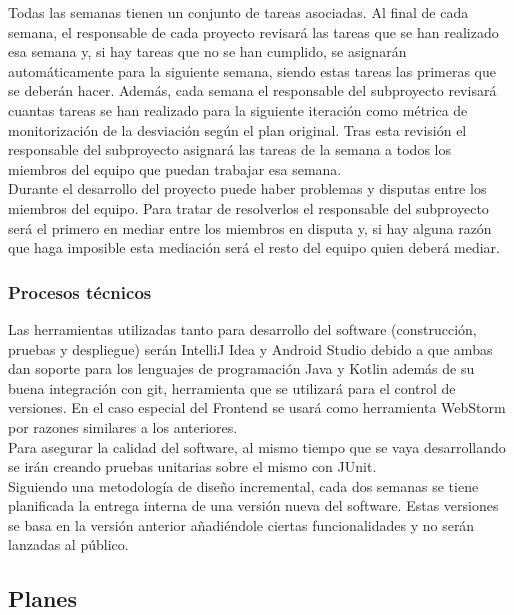 \documentclass[12pt]{article}%
\begin{document}
Todas las semanas tienen un conjunto de tareas asociadas. Al final de cada semana, el responsable de cada proyecto revisar\'a las tareas que se han realizado esa semana y, si hay tareas que no se han cumplido, se asignar\'an autom\'aticamente para la siguiente semana, siendo estas tareas las primeras que se deber\'an hacer. Adem\'as, cada semana el responsable del subproyecto revisar\'a cuantas tareas se han realizado para la siguiente iteraci\'on  como m\'etrica de monitorizaci\'on de la desviaci\'on seg\'un el plan original. Tras esta revisi\'on el responsable del subproyecto asignar\'a las tareas de la semana a todos los miembros del equipo que puedan trabajar esa semana. \\

Durante el desarrollo del proyecto puede haber problemas y disputas entre los miembros del equipo. Para tratar de resolverlos el responsable del subproyecto ser\'a el primero en mediar entre los miembros en disputa y, si hay alguna raz\'on que haga imposible esta mediaci\'on ser\'a el resto del equipo quien deber\'a mediar. \\

\subsubsection{Procesos t\'ecnicos}
Las herramientas utilizadas tanto para desarrollo del software (construcci\'on, pruebas y despliegue) ser\'an IntelliJ Idea y Android Studio debido a que ambas dan soporte para los lenguajes de programaci\'on Java y Kotlin adem\'as de su buena integraci\'on con git, herramienta que se utilizar\'a para el control de versiones. En el caso especial del Frontend se usar\'a como herramienta WebStorm por razones similares a los anteriores.\\

Para asegurar la calidad del software, al mismo tiempo que se vaya desarrollando se ir\'an creando pruebas unitarias sobre el mismo con JUnit.\\

Siguiendo una metodolog\'ia de diseño incremental, cada dos semanas se tiene planificada la entrega interna de una versi\'on nueva del software.  Estas versiones se basa en la versi\'on anterior añadi\'endole ciertas funcionalidades y no ser\'an lanzadas al p\'ublico.\\


\subsection{Planes}
\end{document}
